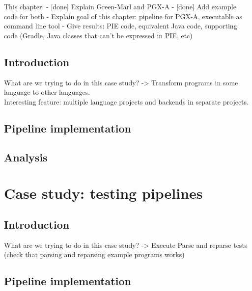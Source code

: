 This chapter:
- [done] Explain Green-Marl and PGX-A
- [done] Add example code for both
- Explain goal of this chapter: pipeline for PGX-A, executable as command line tool
- Give results: PIE code, equivalent Java code, supporting code (Gradle, Java classes that can't be expressed in PIE, etc)

\subsection{Introduction}
\label{sec:evaluation__database__introduction}
What are we trying to do in this case study?
-> Transform programs in some language to other languages.
\\
Interesting feature: multiple language projects and backends in separate projects.


\subsection{Pipeline implementation}
\label{sec:evaluation__database__implementation}


\subsection{Analysis}
\label{sec:evaluation__database__analysis}


\section{Case study: testing pipelines}
\label{sec:evaluation__testing}

\subsection{Introduction}
\label{sec:evaluation__testing__introduction}
What are we trying to do in this case study?
-> Execute Parse and reparse tests (check that parsing and reparsing example programs works)


\subsection{Pipeline implementation}
\label{sec:evaluation__testing__implementation}

